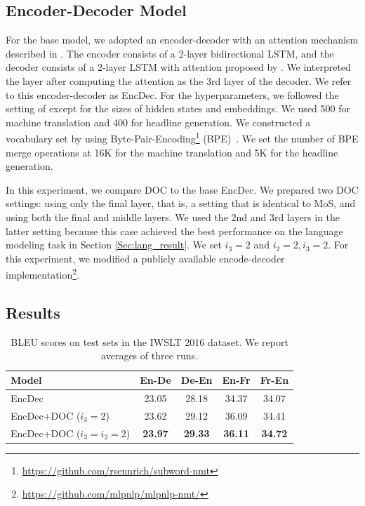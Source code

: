\documentclass[11pt,a4paper]{article}
\begin{document}
\subsection{Encoder-Decoder Model}
For the base model, we adopted an encoder-decoder with an attention mechanism described in .
The encoder consists of a 2-layer bidirectional LSTM, and the decoder consists of a 2-layer LSTM with attention proposed by .
We interpreted the layer after computing the attention as the 3rd layer of the decoder.
We refer to this encoder-decoder as EncDec.
For the hyperparameters, we followed the setting of  except for the sizes of hidden states and embeddings.
We used 500 for machine translation and 400 for headline generation.
We constructed a vocabulary set by using Byte-Pair-Encoding\footnote{\href{https://github.com/rsennrich/subword-nmt}{https://github.com/rsennrich/subword-nmt}} (BPE)~\cite{sennrich-haddow-birch:2016:P16-11}.
We set the number of BPE merge operations at 16K for the machine translation and 5K for the headline generation.


In this experiment, we compare DOC to the base EncDec.
We prepared two DOC settings: using only the final layer, that is, a setting that is identical to MoS, and using both the final and middle layers.
We used the 2nd and 3rd layers in the latter setting because this case achieved the best performance on the language modeling task in Section \ref{Sec:lang_result}.
We set $i_{3} = 2$ and $i_{2} = 2, i_{3} = 2$.
For this experiment, we modified a publicly available encode-decoder implementation\footnote{\href{https://github.com/mlpnlp/mlpnlp-nmt/}{https://github.com/mlpnlp/mlpnlp-nmt/}}.


\subsection{Results}

\begin{table}[!t]
  \centering
  \small
  \tabcolsep=2.5pt
  \begin{tabular}{| l | c c c c |} \hline
  Model & En-De & De-En & En-Fr & Fr-En\\ \hline
  EncDec & 23.05 & 28.18 & 34.37 & 34.07 \\
  EncDec+DOC ($i_3 = 2$) & 23.62 & 29.12 & 36.09 & 34.41 \\
  EncDec+DOC ($i_3 = i_2 = 2$) & {\bf 23.97} & {\bf 29.33} & {\bf 36.11} & {\bf 34.72} \\ \hline
  \end{tabular}
  \caption{BLEU scores on test sets in the IWSLT 2016 dataset. We report averages of three runs.\label{tb:nmt}}
\end{table}
\end{document}
